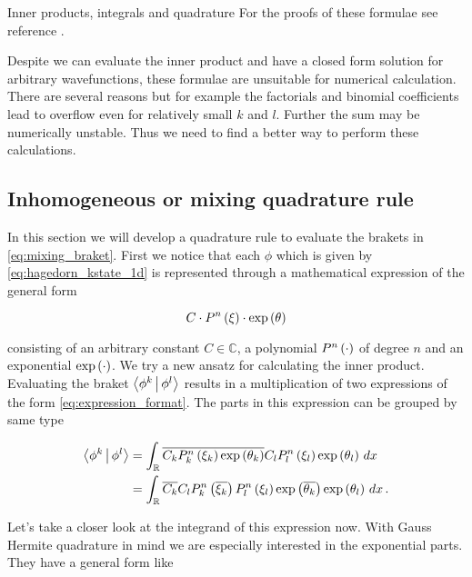 \begin{chapter}{Inner products, integrals and quadrature}
For the proofs of these formulae see reference \cite{H_R_quantization_rules}.

Despite we can evaluate the inner product and have a closed form solution for arbitrary
wavefunctions, these formulae are unsuitable for numerical calculation. There are
several reasons but for example the factorials and binomial coefficients lead to
overflow even for relatively small $k$ and $l$. Further the sum may be numerically
unstable. Thus we need to find a better way to perform these calculations.


\subsection{Inhomogeneous or mixing quadrature rule}
\label{sec:mixing_quadrature}

In this section we will develop a quadrature rule to evaluate the brakets in \eqref{eq:mixing_braket}.
First we notice that each $\phi$ which is given by \eqref{eq:hagedorn_kstate_1d}
is represented through a mathematical expression of the general form

\begin{equation} \label{eq:expression_format}
  C \cdot P^n\left( \xi \right) \cdot \exp \left( \theta \right)
\end{equation}

consisting of an arbitrary constant $C \in \mathbb{C}$, a polynomial $P^n\left( \cdot \right)$
of degree $n$ and an exponential $\exp\left( \cdot \right)$. We try a new ansatz for calculating
the inner product. Evaluating the braket $\Braket{\phi^k | \phi^l}$ results in a
multiplication of two expressions of the form \eqref{eq:expression_format}. The
parts in this expression can be grouped by same type

\begin{equation} \label{eq:expression_reformat}
\begin{split}
  \Braket{\phi^k | \phi^l} & =
  \int_\mathbb{R} \overline{C_k P^n_k\left( \xi_k \right) \exp \left( \theta_k \right)} C_l P^n_l\left( \xi_l \right) \exp \left( \theta_l \right) \,dx \\
  & =   \int_\mathbb{R} \overline{C_k} C_l P^n_k\left( \overline{\xi_k} \right) P^n_l\left( \xi_l \right) \exp \left( \overline{\theta_k} \right) \exp \left( \theta_l \right) \,dx \,.
\end{split}
\end{equation}

Let's take a closer look at the integrand of this expression now. With Gauss Hermite
quadrature in mind we are especially interested in the exponential parts. They have
a general form like


\end{chapter}
